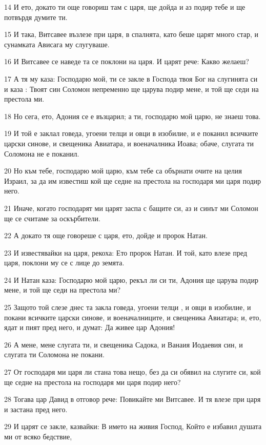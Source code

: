\par 14 И ето, докато ти още говориш там с царя, ще дойда и аз подир тебе и ще потвърдя думите ти.
\par 15 И така, Витсавее възлезе при царя, в спалнята, като беше царят много стар, и сунамката Ависага му слугуваше.
\par 16 И Витсавее се наведе та се поклони на царя. И царят рече: Какво желаеш?
\par 17 А тя му каза: Господарю мой, ти се закле в Господа твоя Бог на слугинята си и каза : Твоят син Соломон непременно ще царува подир мене, и той ще седи на престола ми.
\par 18 Но сега, ето, Адония се е възцарил; а ти, господарю мой царю, не знаеш това.
\par 19 И той е заклал говеда, угоени телци и овци в изобилие, и е поканил всичките царски синове, и свещеника Авиатара, и военачалника Иоава; обаче, слугата ти Соломона не е поканил.
\par 20 Но към тебе, господарю мой царю, към тебе са обърнати очите на целия Израил, за да им известиш кой ще седне на престола на господаря ми царя подир него.
\par 21 Иначе, когато господарят ми царят заспа с бащите си, аз и синът ми Соломон ще се считаме за оскърбители.
\par 22 А докато тя още говореше с царя, ето, дойде и пророк Натан.
\par 23 И известявайки на царя, рекоха: Ето пророк Натан. И той, като влезе пред царя, поклони му се с лице до земята.
\par 24 И Натан каза: Господарю мой царю, рекъл ли си ти, Адония ще царува подир мене, и той ще седи на престола ми?
\par 25 Защото той слезе днес та закла говеда, угоени телци , и овци в изобилие, и покани всичките царски синове, и военачалниците, и свещеника Авиатара; и, ето, ядат и пият пред него, и думат: Да живее цар Адония!
\par 26 А мене, мене слугата ти, и свещеника Садока, и Ванаия Иодаевия син, и слугата ти Соломона не покани.
\par 27 От господаря ми царя ли стана това нещо, без да си обявил на слугите си, кой ще седне на престола на господаря ми царя подир него?
\par 28 Тогава цар Давид в отговор рече: Повикайте ми Витсавее. И тя влезе при царя и застана пред него.
\par 29 И царят се закле, казвайки: В името на живия Господ, Който е избавил душата ми от всяко бедствие,
